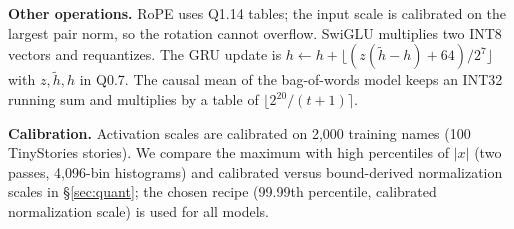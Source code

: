 \textbf{Other operations.} RoPE uses Q1.14 tables; the input scale is calibrated on the largest pair norm, so the rotation
cannot overflow. SwiGLU multiplies two INT8 vectors and requantizes. The GRU update is
$h\leftarrow h+\lfloor(z(\tilde h-h)+64)/2^7\rfloor$ with $z,\tilde h,h$ in Q0.7. The causal mean of the bag-of-words model
keeps an INT32 running sum and multiplies by a table of $\lfloor 2^{20}/(t+1)\rceil$.

\textbf{Calibration.} Activation scales are calibrated on 2{,}000 training names (100 TinyStories stories). We compare the
maximum with high percentiles of $|x|$ (two passes, 4{,}096-bin histograms) and calibrated versus bound-derived
normalization scales in \S\ref{sec:quant}; the chosen recipe (99.99th percentile, calibrated normalization scale) is used
for all models.
